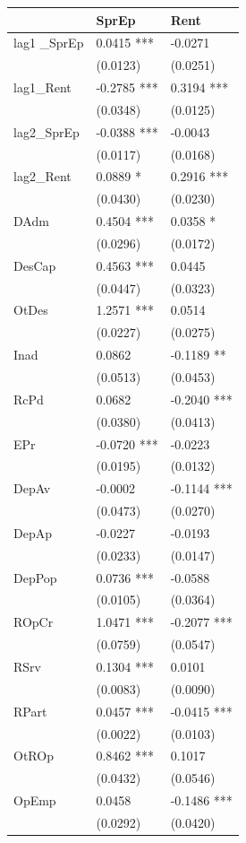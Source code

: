 \documentclass[
  12pt,
  12pt,
  openright,
  oneside,
  a4paper,
  chapter=TITLE,
  section=TITLE,
  subsection=TITLE,
  subsubsection=TITLE,
  english,
  portugues,
  sumario=tradicional]{abntex2}
\begin{document}
\begin{longtable}[]{@{}lll@{}}
\toprule
& SprEp & Rent \\
\midrule
\endhead
lag1 \_SprEp & 0.0415 *** & -0.0271 \\
& (0.0123) & (0.0251) \\
lag1\_Rent & -0.2785 *** & 0.3194 *** \\
& (0.0348) & (0.0125) \\
lag2\_SprEp & -0.0388 *** & -0.0043 \\
& (0.0117) & (0.0168) \\
lag2\_Rent & 0.0889 * & 0.2916 *** \\
& (0.0430) & (0.0230) \\
DAdm & 0.4504 *** & 0.0358 * \\
& (0.0296) & (0.0172) \\
DesCap & 0.4563 *** & 0.0445 \\
& (0.0447) & (0.0323) \\
OtDes & 1.2571 *** & 0.0514 \\
& (0.0227) & (0.0275) \\
Inad & 0.0862 & -0.1189 ** \\
& (0.0513) & (0.0453) \\
RcPd & 0.0682 & -0.2040 *** \\
& (0.0380) & (0.0413) \\
EPr & -0.0720 *** & -0.0223 \\
& (0.0195) & (0.0132) \\
DepAv & -0.0002 & -0.1144 *** \\
& (0.0473) & (0.0270) \\
DepAp & -0.0227 & -0.0193 \\
& (0.0233) & (0.0147) \\
DepPop & 0.0736 *** & -0.0588 \\
& (0.0105) & (0.0364) \\
ROpCr & 1.0471 *** & -0.2077 *** \\
& (0.0759) & (0.0547) \\
RSrv & 0.1304 *** & 0.0101 \\
& (0.0083) & (0.0090) \\
RPart & 0.0457 *** & -0.0415 *** \\
& (0.0022) & (0.0103) \\
OtROp & 0.8462 *** & 0.1017 \\
& (0.0432) & (0.0546) \\
OpEmp & 0.0458 & -0.1486 *** \\
& (0.0292) & (0.0420) \\

\end{longtable}
\end{document}
